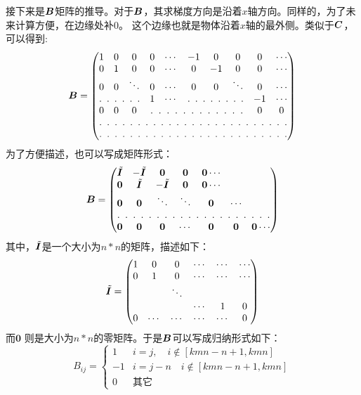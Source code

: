 接下来是$\bm{B}$矩阵的推导。对于$\bm{B}$，其求梯度方向是沿着$x$轴方向。同样的，为了未来计算方便，在边缘处补$0$。
这个边缘也就是物体沿着$x$轴的最外侧。类似于$\bm{C}$，可以得到:
\begin{equation*}
\B = \begin{pmatrix}
1 & 0 & 0 & 0 & \cdots &-1 & 0 &0 &0 &\cdots \\
0 & 1 & 0 & 0 &\cdots &0 & -1 &0 &0 &\cdots \\
0 & 0 & \ddots & 0 & \cdots & 0 & 0 & \ddots & 0& \cdots \\
\hdotsfor[3]{3}& 1& \cdots &\hdotsfor[3]{3}&-1&\cdots \\
0 & 0 & 0 & \hdotsfor[3]{5}&0&0 \\
\hdotsfor[3]{10}\\
\hdotsfor[3]{10}
\end{pmatrix}
\end{equation*}
为了方便描述，也可以写成矩阵形式：
\begin{equation*}
\B = \begin{pmatrix}
\tilde{\bI} &  -\tilde{\bI} & \0 & \0 & \0 \cdots \\
\0 & \tilde{\bI} &  -\tilde{\bI} & \0 & \0 \cdots \\
\0 & \0  & \ddots & \ddots & \0 & \cdots \\
\hdotsfor[3]{7} \\
\0 & \0 & \0 &\cdots & \0 & \0 &\0 \cdots
\end{pmatrix}
\end{equation*}
其中，$\tilde{\bm{I}}$是一个大小为$n * n$的矩阵，描述如下：
\begin{equation*}
\tilde{\bm{I}} = \begin{pmatrix}
1 & 0 & 0 & \cdots &\cdots & \cdots\\
0 & 1 & 0 & \cdots &\cdots & \cdots\\
 & &\ddots & \\
& & & \cdots& 1 & 0 \\
0 & \cdots & \cdots & \cdots & \cdots & 0
\end{pmatrix}
\end{equation*}
而$\bm 0$ 则是大小为$n * n$的零矩阵。于是$\bm{B}$可以写成归纳形式如下：
\begin{equation}\label{eq:B}
B_{ij} = \begin{cases}
1 & i=j, \quad i \notin [kmn-n+1,kmn] \\
-1 & i = j-n \quad i \notin [kmn-n+1,kmn] \\
0 & \text{其它}
\end{cases}
\end{equation}

